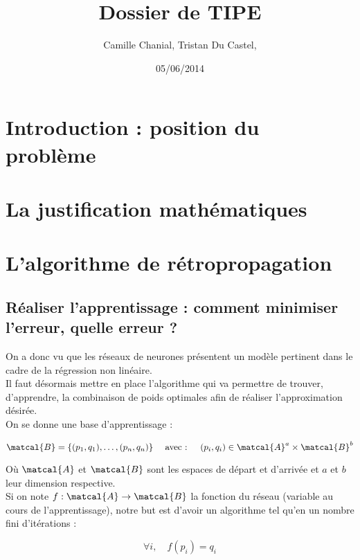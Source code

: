 \documentclass[a4paper, 11pt]{article}
\begin{document}
 
\title{Dossier de TIPE}
\author{Camille Chanial, Tristan Du Castel, }
\date{05/06/2014} 
 
\maketitle

 
\tableofcontents
 

\newpage

\section*{Introduction : position du problème}

\section{La justification mathématiques}
\section{L'algorithme de rétropropagation}

\subsection{Réaliser l'apprentissage : comment minimiser l'erreur, quelle erreur ?}

On a donc vu que les réseaux de neurones présentent un modèle pertinent dans le cadre de la régression non linéaire.\\
Il faut désormais mettre en place l'algorithme qui va permettre de trouver, d'apprendre, la combinaison de poids optimales afin de réaliser l'approximation désirée.\\
On se donne une base d'apprentissage :

$$\matcal{B} = \{(p_1,q_1), \dots, (p_n, q_n)\} \quad \text{ avec : } \quad (p_i,q_i) \in \matcal{A}^a \times \matcal{B}^b$$

Où $\matcal{A}$ et $\matcal{B}$ sont les espaces de départ et d'arrivée et $a$ et $b$ leur dimension respective.\\
Si on note $f:\matcal{A}\to \matcal{B}$ la fonction du réseau (variable au cours de l'apprentissage), notre but est d'avoir un algorithme tel qu'en un nombre fini d'itérations :

$$ \forall i, \quad f(p_i) = q_i $$
\end{document}
